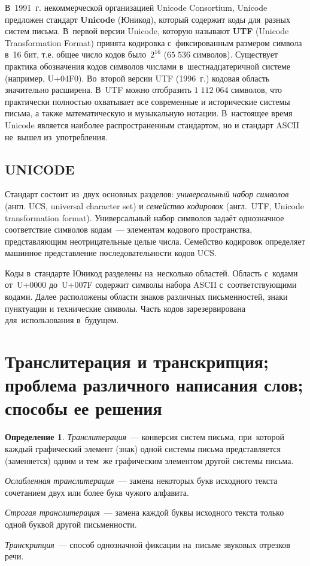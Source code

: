 \documentclass[12pt]{article}
\theoremstyle{definition}
\newtheorem*{defn}{Определение}
\theoremstyle{remark}
\numberwithin{equation}{section}
\begin{document}
В~1991~г. некоммерческой организацией Unicode Consortium, Unicode предложен стандарт
\textbf{Unicode} (Юникод), который содержит коды для~разных систем письма.
В~первой версии Unicode, которую называют \textbf{UTF} (Unicode
Transformation Format) принята кодировка с~фиксированным размером символа в~16 бит,
т.е. общее число кодов было~$2^{16}$ ($65\;536$ символов). Существует практика
обозначения кодов символов числами в~шестнадцатеричной системе (например, U+04F0).
Во~второй версии UTF (1996~г.) кодовая область значительно расширена.
В~UTF можно отобразить $1\;112\;064$ символов, что практически полностью
охватывает все современные и исторические системы письма, а также математическую
и музыкальную нотации. В~настоящее время Unicode является наиболее распространенным
стандартом, но и стандарт ASCII не~вышел из~употребления.

\subsection{UNICODE}
Стандарт состоит из~двух основных разделов: \textsl{универсальный набор символов}
(англ. UCS, universal character set) и \textsl{семейство кодировок} (англ.~UTF,
Unicode transformation format). Универсальный набор символов задаёт однозначное
соответствие символов кодам~--- элементам кодового пространства, представляющим
неотрицательные целые числа. Семейство кодировок определяет машинное представление
последовательности кодов UCS.

Коды в~стандарте Юникод разделены на~несколько областей. Область с~кодами от~U+0000
до~U+007F содержит символы набора ASCII с~соответствующими кодами.
Далее расположены области знаков различных письменностей, знаки пунктуации и
технические символы. Часть кодов зарезервирована для~использования в~будущем.

\section{Транслитерация и транскрипция; проблема различного написания слов; способы ее решения}
\begin{defn}
\textsl{Транслитерация}~--- конверсия систем письма, при~которой каждый
графический элемент (знак) одной системы письма представляется (заменяется)
одним и тем~же графическим элементом другой системы письма.

\textsl{Ослабленная транслитерация}~--- замена некоторых букв исходного текста
сочетанием двух или более букв чужого алфавита.

\textsl{Строгая транслитерация}~--- замена каждой буквы исходного текста
только одной буквой другой письменности.

\textsl{Транскрипция}~--- способ однозначной фиксации на~письме звуковых
отрезков речи.
\end{defn}
\end{document}

